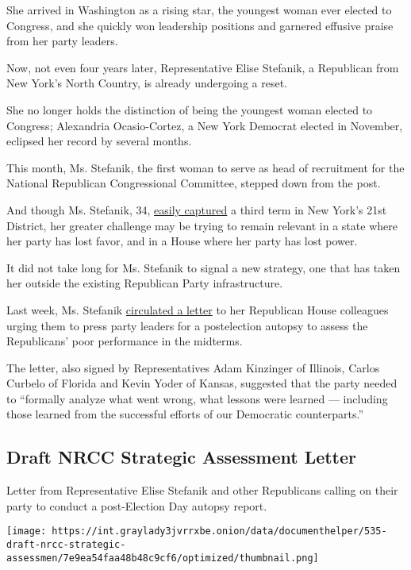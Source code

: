 She arrived in Washington as a rising star, the youngest woman ever
elected to Congress, and she quickly won leadership positions and
garnered effusive praise from her party leaders.

Now, not even four years later, Representative Elise Stefanik, a
Republican from New York's North Country, is already undergoing a reset.

She no longer holds the distinction of being the youngest woman elected
to Congress; Alexandria Ocasio-Cortez, a New York Democrat elected in
November, eclipsed her record by several months.

This month, Ms. Stefanik, the first woman to serve as head of
recruitment for the National Republican Congressional Committee, stepped
down from the post.

And though Ms. Stefanik, 34,
\href{https://www.nytimes3xbfgragh.onion/elections/results/new-york-house-district-21}{easily
captured} a third term in New York's 21st District, her greater
challenge may be trying to remain relevant in a state where her party
has lost favor, and in a House where her party has lost power.

It did not take long for Ms. Stefanik to signal a new strategy, one that
has taken her outside the existing Republican Party infrastructure.

Last week, Ms. Stefanik
\href{https://thehill.com/homenews/house/420651-gop-lawmakers-call-for-autopsy-on-historic-losses}{circulated
a letter} to her Republican House colleagues urging them to press party
leaders for a postelection autopsy to assess the Republicans' poor
performance in the midterms.

The letter, also signed by Representatives Adam Kinzinger of Illinois,
Carlos Curbelo of Florida and Kevin Yoder of Kansas, suggested that the
party needed to ``formally analyze what went wrong, what lessons were
learned --- including those learned from the successful efforts of our
Democratic counterparts.''

\hypertarget{draft-nrcc-strategic-assessment-letter}{%
\subsection{Draft NRCC Strategic Assessment
Letter}\label{draft-nrcc-strategic-assessment-letter}}

Letter from Representative Elise Stefanik and other Republicans calling
on their party to conduct a post-Election Day autopsy report.

\texttt{[image: https://int.graylady3jvrrxbe.onion/data/documenthelper/535-draft-nrcc-strategic-assessmen/7e9ea54faa48b48c9cf6/optimized/thumbnail.png]}

